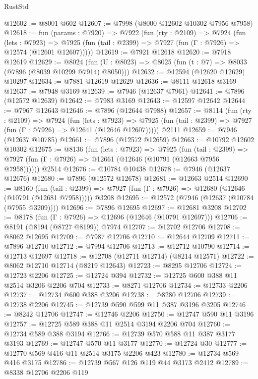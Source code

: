 \begin{lexlean}{RustStd}
\begin{coremodule}
{\begin{coremodule}
{{{{{{{{{{{{{{{{{{{{{{{{{{{{{{{{{{{{{{{{{{{{{{{{{{@12602 := @8001 @602
@12607 := @7998 (@8000 @12602 @10302 @7956 @7958)
@12618 := fun (params : @7920) =>
  @7922
    (fun (rty : @2109) =>
    @7924
      (fun (lets : @7923) =>
      @7925 (fun (tail : @2399) => @7927 (fun (Γ : @7926) => @12574 (@12601 @12607)))))
@12619 := @7921 @12618
@12620 := @7918 @12619
@12629 := @8024
    (fun (U : @8023) => @8025 (fun (t : @7) => @8033 (@7896 (@8039 @10299 @7914) @8050)))
@12632 := @12594 (@12620 @12629) @10297
@12634 := @7881 @12619 @12629
@12636 := @8111 @12618 @3169
@12637 := @7948 @3169
@12639 := @7946 (@12637 @7961)
@12641 := @7896 (@12572 @12639)
@12642 := @7983 @3169
@12643 := @12597 @12642
@12644 := @7967 @12643
@12646 := @7896 (@12644 @7988)
@12657 := @8114
    (fun (rty : @2109) =>
    @7924
      (fun (lets : @7923) =>
      @7925 (fun (tail : @2399) => @7927 (fun (Γ : @7926) => @12641 (@12646 @12607)))))
    @2111
@12659 := @7946 (@12637 @10785)
@12661 := @7896 (@12572 @12659)
@12663 := @10792 @12602 @10302
@12675 := @8136
    (fun (lets : @7923) =>
    @7925
      (fun (tail : @2399) =>
      @7927 (fun (Γ : @7926) => @12661 (@12646 (@10791 (@12663 @7956 @7958))))))
    @2514
@12676 := @10784 @10438
@12678 := @7946 (@12637 @12676)
@12680 := @7896 (@12572 @12678)
@12681 := @12663 @2514
@12690 := @8160
    (fun (tail : @2399) => @7927 (fun (Γ : @7926) => @12680 (@12646 (@10791 (@12681 @7958)))))
    @3208
@12695 := @12572 (@7946 (@12637 (@10784 (@7955 @3209))))
@12696 := @7896 @12695
@12697 := @12681 @3208
@12702 := @8178 (fun (Γ : @7926) => @12696 (@12646 (@10791 @12697)))
@12706 := @8191 (@8194 (@8727 @8199)) @7974
@12707 := @12702 @12706
@12708 := @8062 @12695
@12709 := @7987 @12706
@12710 := @12644 @12709
@12711 := @7896 @12710
@12712 := @7994 @12706
@12713 := @12712 @10790
@12714 := @12713 @12697
@12718 := @12708 (@12711 @12714) (@8214 @12571)
@12722 := @8062 @12710 @12714 (@8219 @12643)
@12723 := @8295 @12706
@12724 := @12723 @2206
@12725 := @12724 @394
@12732 := @12725 @600 @388 @11 @2514 @3206 @2206 @704
@12733 := @8271 @12706
@12734 := @12733 @2206
@12737 := @12734 @600 @388 @3206
@12738 := @8280 @12706
@12739 := @12738 @2206
@12745 := @12739 @590 @599 @11 @387 @3196 @3205
@12746 := @8242 @12706
@12747 := @12746 @2206
@12750 := @12747 @590 @11 @3196
@12757 := @12725 @589 @388 @11 @2514 @3194 @2206 @704
@12760 := @12734 @589 @388 @3194
@12766 := @12739 @570 @588 @11 @387 @3177 @3193
@12769 := @12747 @570 @11 @3177
@12770 := @12724 @30
@12777 := @12770 @569 @416 @11 @2514 @3175 @2206 @423
@12780 := @12734 @569 @416 @3175
@12786 := @12739 @567 @126 @119 @44 @3173 @2412
@12789 := @8338 @12706 @2206 @119
}}}}}}}}}}}}}}}}}}}}}}}}}}}}}}}}}}}}}}}}}}}}}}}}}}
\end{coremodule}}
\end{coremodule}
\end{lexlean}
